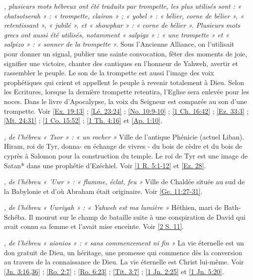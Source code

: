 \begin{multicols}{2}
\textit{, plusieurs mots hébreux ont été traduits par trompette, les plus utilisés sont : « chatsotserah » : « trompette, clairon » ; « yobel » : « bélier, corne de bélier », « retentissant », « jubilé », et « showphar » : « corne de bélier ». Plusieurs mots grecs ont aussi été utilisés, notamment « salpigx » : « une trompette » et « salpizo » : « sonner de la trompette ».}\newline
Sous l'Ancienne Alliance, on l'utilisait pour donner un signal, publier une sainte convocation, fêter des moments de joie, signifier une victoire, chanter des cantiques en l'honneur de Yahweh, avertir et rassembler le peuple. Le son de la trompette est aussi l'image des voix prophétiques qui crient et appellent le peuple à revenir totalement à Dieu. Selon les Ecritures, lorsque la dernière trompette retentira, l'Eglise sera enlevée pour les noces. Dans le livre d'Apocalypse, la voix du Seigneur est comparée au son d'une trompette. Voir \vref{Ex. 19:13} ; \vref{Lé. 23:24} ; \vref{No. 10:9-10} ; \vref{1 Ch. 16:42} ; \vref{Ez. 33:3} ; \vref{Mt. 24:31} ; \vref{1 Co. 15:52} ; \vref{1 Th. 4:16} et \vref{Ap. 1:10}.

\textit{, de l'hébreu « Tsor » : « un rocher »}\newline
Ville de l'antique Phénicie (actuel Liban). Hiram, roi de Tyr, donna- en échange de vivres - du bois de cèdre et du bois de cyprès à Salomon pour la construction du temple. Le roi de Tyr est une image de Satan* dans une prophétie d'Ezéchiel. Voir \vref{1 R. 5:1-12} et \vref{Ez. 28}.

\textit{, de l'hébreu « 'Uwr » : « flamme, éclat, feu »}\newline
Ville de Chaldée située au sud de la Babylonie et d'où Abraham était originaire. Voir \vref{Ge. 11:27-31}.

\textit{, de l'hébreu « Uwriyah » : « Yahweh est ma lumière »}\newline
Héthien, mari de Bath-Schéba. Il mourut sur le champ de bataille suite à une conspiration de David qui avait connu sa femme et l'avait mise enceinte. Voir \vref{2 S. 11}.

\textit{, de l'hébreu « aionios » : « sans commencement ni fin »}\newline
La vie éternelle est un don gratuit de Dieu, un héritage, une promesse qui commence dès la conversion au travers de la connaissance de Dieu. La vie éternelle est Christ lui-même. Voir \vref{Jn. 3:16,36} ; \vref{Ro. 2:7} ; \vref{Ro. 6:23} ; \vref{Tit. 3:7} ; \vref{1 Jn. 2:25} et \vref{1 Jn. 5:20}.


\end{multicols}
